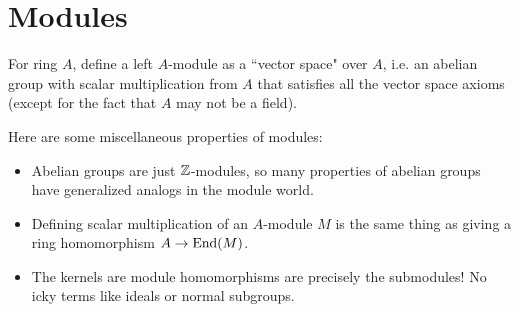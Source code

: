 \section{Modules}
For ring $A$, define a left $A$-module as a ``vector space" over $A$, i.e. an abelian group with scalar multiplication from $A$ that satisfies all the vector space axioms (except for the fact that $A$ may not be a field).

Here are some miscellaneous properties of modules:
\begin{itemize}
    \item Abelian groups are just ${\mathbb Z}$-modules, so many properties of abelian groups have generalized analogs in the module world.
    \item Defining scalar multiplication of an $A$-module $M$ is the same thing as giving a ring homomorphism $A \rightarrow \operatorname{End}(M)$.
    \item The kernels are module homomorphisms are precisely the submodules! No icky terms like ideals or normal subgroups.
\end{itemize}
